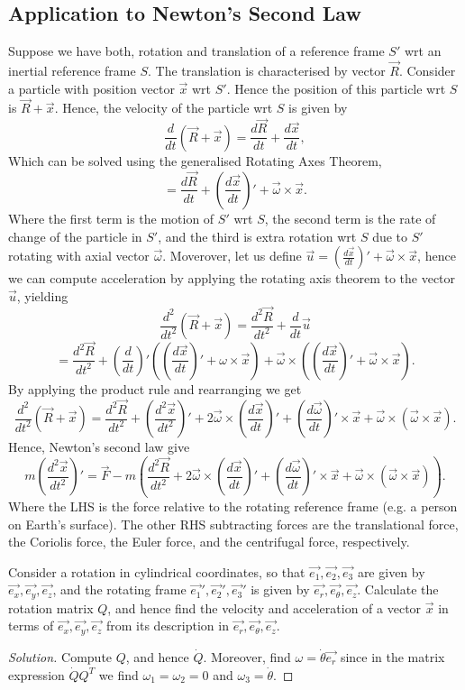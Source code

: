 \subsection{Application to Newton's Second Law}
Suppose we have both, rotation and translation of a reference frame $S'$ wrt an
inertial reference frame $S$. The translation is characterised by vector
$\vec{R}$. Consider a particle with position vector $\vec{x}$ wrt $S'$. Hence
the position of this particle wrt $S$ is $\vec{R}+\vec{x}$. Hence, the velocity
of the particle wrt $S$ is given by
\[\frac{d}{dt}(\vec{R}+\vec{x}) = \frac{d\vec{R}}{dt} + \frac{d\vec{x}}{dt},\]
Which can be solved using the generalised Rotating Axes Theorem,
\[=\frac{d\vec{R}}{dt} + (\frac{d\vec{x}}{dt})' +
\vec{\omega}\times\vec{x}.\]
Where the first term is the motion of $S'$ wrt $S$, the second term is the rate
of change of the particle in $S'$, and the third is extra rotation wrt $S$ due
to $S'$ rotating with axial vector $\vec{\omega}$. Moverover, let us define
$\vec{u}=(\frac{d\vec{x}}{dt})' + \vec{\omega}\times\vec{x}$, 
hence we can compute acceleration by applying the rotating axis theorem to the
vector $\vec{u}$, yielding
\[\frac{d^2}{dt^2}(\vec{R}+\vec{x})= \frac{d^2\vec{R}}{dt^2} +
\frac{d}{dt}\vec{u}\]
\[ = \frac{d^2\vec{R}}{dt^2}+ \left( \frac{d}{dt}
\right)'\left( \left( \frac{d\vec{x}}{dt} \right)'+\omega\times\vec{x} \right) +
\vec{\omega}\times\left( \left( \frac{d\vec{x}}{dt}
\right)'+\vec{\omega}\times\vec{x} \right).\]
By applying the product rule and rearranging we get
\[\frac{d^2}{dt^2}(\vec{R}+\vec{x}) = \frac{d^2\vec{R}}{dt^2}+ \left(
\frac{d^2\vec{x}}{dt^2} \right)' + 2\vec{\omega}\times\left(
\frac{d\vec{x}}{dt} \right)' + \left( \frac{d\vec{\omega}}{dt}
\right)'\times\vec{x} + \vec{\omega}\times(\vec{\omega}\times\vec{x}).\]
Hence, Newton's second law give
\[m\left( \frac{d^2\vec{x}}{dt^2} \right)' = \vec{F} - m\left(
    \frac{d^2\vec{R}}{dt^2}+ 2\vec{\omega}\times\left( \frac{d\vec{x}}{dt}
    \right)' + \left( \frac{d\vec{\omega}}{dt}
\right)'\times\vec{x} + \vec{\omega}\times(\vec{\omega}\times\vec{x}) \right).\]
Where the LHS is the force relative to the rotating reference frame (e.g. a
person on Earth's surface). The other RHS subtracting forces are the
translational force, the Coriolis force, the Euler force, and the centrifugal
force, respectively. 

\begin{exercise}
  Consider a rotation in cylindrical coordinates, so that
  $\vec{e_1},\vec{e_2},\vec{e_3}$ are given by $\vec{e_x},\vec{e_y},\vec{e_z}$,
  and the rotating frame  $\vec{e_1}',\vec{e_2}',\vec{e_3}'$ is given by
  $\vec{e_r},\vec{e_{\theta}},\vec{e_z}$. Calculate the rotation matrix $Q$, and
  hence find the velocity and acceleration of a vector $\vec{x}$ in terms of
  $\vec{e_x},\vec{e_y},\vec{e_z}$ from its description in
  $\vec{e_r},\vec{e_{\theta}},\vec{e_z}$.
\end{exercise}
\begin{proof}[Solution]
  Compute $Q$, and hence $\dot{Q}$. Moreover, find
  $\omega=\dot{\theta}\vec{e_r}$  since in the matrix expression $\dot{Q}Q^T$ we
  find $\omega_1=\omega_2=0$ and $\omega_3=\dot{\theta}$.
\end{proof}

